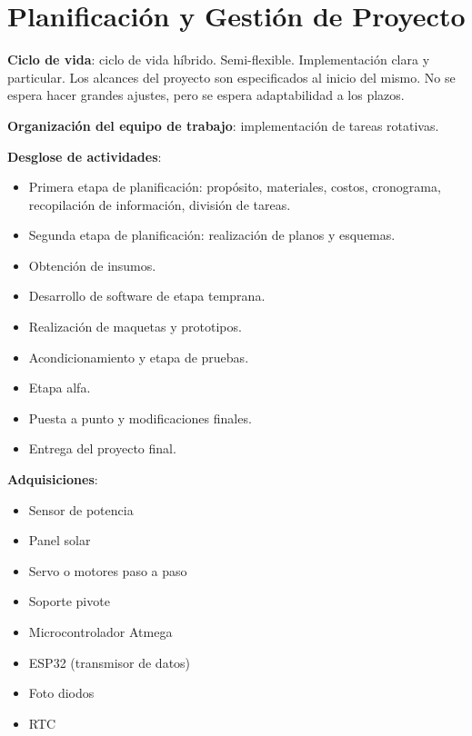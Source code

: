 \documentclass[a4paper,12pt]{article}
\begin{document}
\section{Planificación y Gestión de Proyecto}

\textbf{Ciclo de vida}: ciclo de vida híbrido. Semi-flexible. Implementación clara y particular. Los alcances del proyecto son especificados al inicio del mismo. No se espera hacer grandes ajustes, pero se espera adaptabilidad a los plazos.

\textbf{Organización del equipo de trabajo}: implementación de tareas rotativas.

\textbf{Desglose de actividades}:
\begin{itemize}
    \item Primera etapa de planificación: propósito, materiales, costos, cronograma, recopilación de información, división de tareas.
    \item Segunda etapa de planificación: realización de planos y esquemas.
    \item Obtención de insumos.
    \item Desarrollo de software de etapa temprana.
    \item Realización de maquetas y prototipos.
    \item Acondicionamiento y etapa de pruebas.
    \item Etapa alfa.
    \item Puesta a punto y modificaciones finales.
    \item Entrega del proyecto final.
\end{itemize}

\textbf{Adquisiciones}: 
\begin{itemize}
    \item Sensor de potencia
    \item Panel solar
    \item Servo o motores paso a paso
    \item Soporte pivote
    \item Microcontrolador Atmega
    \item ESP32 (transmisor de datos)
    \item Foto diodos
    \item RTC
\end{itemize}
\end{document}

